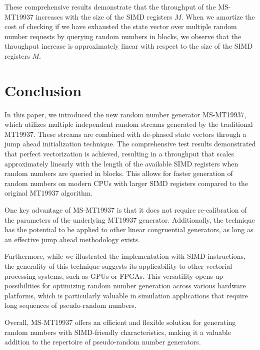 \documentclass[preprint,1p,times]{elsarticle}
\begin{document}
These comprehensive results demonstrate that the throughput of the MS-MT19937 increases with the size of the SIMD registers $M$. When we amortize the cost of checking if we have exhausted the state vector over multiple random number requests by querying random numbers in blocks, we observe that the throughput increase is approximately linear with respect to the size of the SIMD registers $M$.

\section{Conclusion}
In this paper, we introduced the new random number generator MS-MT19937, which utilizes multiple independent random streams generated by the traditional MT19937. These streams are combined with de-phased state vectors through a jump ahead initialization technique. The comprehensive test results demonstrated that perfect vectorization is achieved, resulting in a throughput that scales approximately linearly with the length of the available SIMD registers when random numbers are queried in blocks. This allows for faster generation of random numbers on modern CPUs with larger SIMD registers compared to the original MT19937 algorithm.

One key advantage of MS-MT19937 is that it does not require re-calibration of the parameters of the underlying MT19937 generator. Additionally, the technique has the potential to be applied to other linear congruential generators, as long as an effective jump ahead methodology exists.

Furthermore, while we illustrated the implementation with SIMD instructions, the generality of this technique suggests its applicability to other vectorial processing systems, such as GPUs or FPGAs. This versatility opens up possibilities for optimizing random number generation across various hardware platforms, which is particularly valuable in simulation applications that require long sequences of pseudo-random numbers.

Overall, MS-MT19937 offers an efficient and flexible solution for generating random numbers with SIMD-friendly characteristics, making it a valuable addition to the repertoire of pseudo-random number generators.
\end{document}
